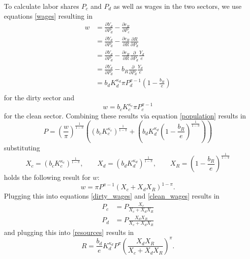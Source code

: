 To calculate labor shares $P_c$ and $P_d$ as well as wages in the two sectors, we use equations \eqref{wages} resulting in
\begin{align}
	w &= \frac{\partial Y_d}{\partial P_d} - \frac{\partial c_R}{\partial P_c} \nonumber \\
	&= \frac{\partial Y_d}{\partial P_d} - \frac{\partial c_R}{\partial R} \frac{\partial R}{\partial P_d} \nonumber \\
	&= \frac{\partial Y_d}{\partial P_d} - \frac{\partial c_R}{\partial R} \frac{\partial}{\partial P_d} \frac{Y_d}{e} \nonumber \\
	&= \frac{\partial Y_d}{\partial P_d} - b_R \frac{\partial}{\partial P_d} \frac{Y_d}{e} \nonumber \\
	&= b_d K_d^{\kappa_d} \pi P_d^{\pi-1}\left( 1-\frac{b_R}{e} \right) \\
	\label{dirty_wages}
\end{align}
for the dirty sector and
\begin{equation}
	w = b_c K_c^{\kappa_c} \pi P_c^{\pi-1}
	\label{clean_wages}
\end{equation}
for the clean sector. Combining these results via equation \eqref{population} results in
\begin{equation}
	P = \left( \frac{w}{\pi} \right)^{\frac{1}{1-\pi}}\left( \left( b_c K_c^{\kappa_c} \right)^{\frac{1}{1-\pi}} + \left( b_d K_d^{\kappa_d} \left( 1 - \frac{b_R}{e} \right)^{\frac{1}{1-\pi}} \right) \right)
\end{equation}
substituting 
\begin{equation}
	X_c = (b_c K_c^{\kappa_c})^{\frac{1}{1-\pi}}, \qquad X_d = (b_d K_d^{\kappa_d})^{\frac{1}{1-\pi}}, \qquad X_R = \left( 1 - \frac{b_R}{e} \right)^{\frac{1}{1-\pi}}
	\label{substitutions}
\end{equation}
holds the following result for $w$:
\begin{equation}
	w = \pi P^{\pi-1}\left( X_c + X_d X_R \right)^{1-\pi}.
	\label{wage_result}
\end{equation}
Plugging this into equations \eqref{dirty_wages} and \eqref{clean_wages} results in 
\begin{align}
	P_c &= P \frac{X_c}{X_c + X_d X_R} \label{clean_labor} \\
	P_d &= P \frac{X_d X_R}{X_c + X_d X_R} \label{dirty_labor}
\end{align}
and plugging this into \eqref{resources} results in
\begin{equation}
	R = \frac{b_d}{e}K_d^{\kappa_d}P^{\pi}\left( \frac{X_d X_R}{X_c + X_d X_R} \right)^{\pi}.
	\label{R_result}
\end{equation}

